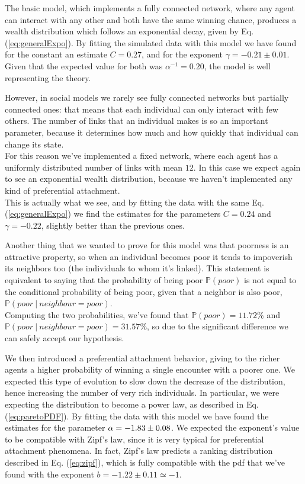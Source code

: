 The basic model, which implements a fully connected network, where any agent can interact with any other and both have the same winning chance, produces a wealth distribution which follows an exponential decay, given by Eq. (\ref{eq:generalExpo}).
By fitting the simulated data with this model we have found for the constant an estimate $C = 0.27$, and for the exponent $\gamma = -0.21 \pm 0.01$.
Given that the expected value for both was $\alpha^{-1} = 0.20$, the model is well representing the theory.

However, in social models we rarely see fully connected networks but partially connected ones: that means that each individual can only interact with few others.
The number of links that an individual makes is so an important parameter, because it determines how much and how quickly that individual can change its state. \\
For this reason we've implemented a fixed network, where each agent has a uniformly distributed number of links with mean $12$.
In this case we expect again to see an exponential wealth distribution, because we haven't implemented any kind of preferential attachment. \\
This is actually what we see, and by fitting the data with the same Eq. (\ref{eq:generalExpo}) we find the estimates for the parameters $C = 0.24$ and $\gamma = -0.22$, slightly better than the previous ones.

Another thing that we wanted to prove for this model was that poorness is an attractive property, so when an individual becomes poor it tends to impoverish its neighbors too (the individuals to whom it's linked).
This statement is equivalent to saying that the probability of being poor $\mathbb{P}(poor)$ is not equal to the conditional probability of being poor, given that a neighbor is also poor, $\mathbb{P}(poor \ | \ neighbour=poor)$. \\
Computing the two probabilities, we've found that $\mathbb{P}(poor) = 11.72 \%$ and \\ $\mathbb{P}(poor \ | \ neighbour=poor) = 31.57 \%$, so due to the significant difference we can safely accept our hypothesis.

We then introduced a preferential attachment behavior, giving to the richer agents a higher probability of winning a single encounter with a poorer one.
We expected this type of evolution to slow down the decrease of the distribution, hence increasing the number of very rich individuals.
In particular, we were expecting the distribution to become a power law, as described in Eq. (\ref{eq:paretoPDF}).
By fitting the data with this model we have found the estimates for the parameter $\alpha = -1.83 \pm 0.08$.
We expected the exponent's value to be compatible with Zipf's law, since it is very typical for preferential attachment phenomena.
In fact, Zipf's law predicts a ranking distribution described in Eq. (\ref{eq:zipf}), which is fully compatible with the pdf that we've found with the exponent $b = -1.22 \pm 0.11 \simeq -1$.

